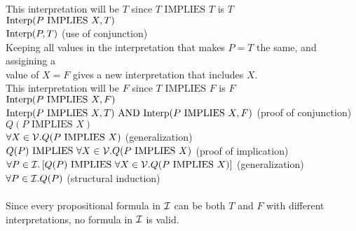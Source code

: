 \documentclass[11pt]{article}
\newcommand{\Implies}{\mbox{ IMPLIES }}
\newcommand{\And}{\mbox{ AND }}
\begin{document}
\begin{enumerate}
\null\qquad\quad This interpretation will be $T$ since $T\Implies T$ is $T$\\
\null\qquad\quad ${\rm Interp}(P\Implies X, T)$\\
\null\qquad\quad ${\rm Interp}(P, T)$ (use of conjunction)\\
\null\qquad\quad Keeping all values in the interpretation that makes $P = T$ the same, and assigining a\\
\null\qquad\quad value of $X= F$ gives a new interpretation that includes $X$.\\
\null\qquad\quad This interpretation will be $F$ since $T\Implies F$ is $F$\\
\null\qquad\quad ${\rm Interp}(P\Implies X, F)$\\
\null\qquad\quad ${\rm Interp}(P\Implies X, T)\And {\rm Interp}(P\Implies X, F) $ (proof of conjunction)\\
\null\qquad\quad $Q(P\Implies X)$\\
\null\qquad $\forall X\in{\cal V}.Q(P\Implies X)$ (generalization)\\
\null\quad $Q(P)\Implies \forall X\in{\cal V}.Q(P\Implies X)$ (proof of implication)\\
$\forall P\in {\cal I}.\left[Q(P)\Implies \forall X\in{\cal V}.Q(P\Implies X)\right]$ (generalization)\\
$\forall P\in {\cal I}.Q(P)$ (structural induction)\\\\
Since every propositional formula in ${\cal I}$ can be both $T$ and $F$ with different interpretations, no formula in ${\cal I}$ is valid.
\begin{solution}
\end{solution}
\end{enumerate}
\end{document}
